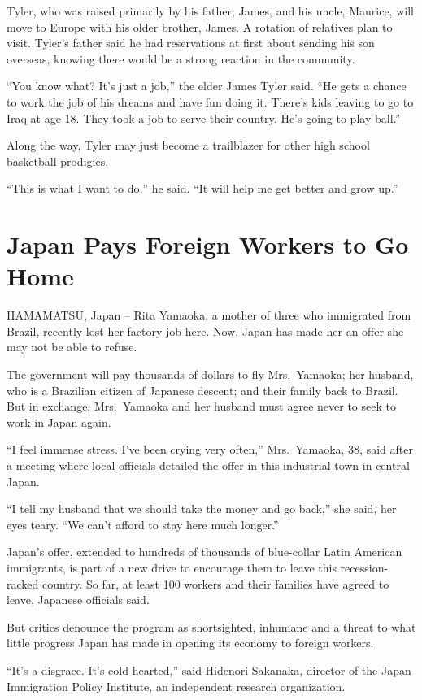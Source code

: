 \documentclass[12pt,a4paper,onecolumn]{article}
\begin{document}
Tyler, who was raised primarily by his father, James, and his uncle, Maurice, will move to Europe
with his older brother, James. A rotation of relatives plan to visit. Tyler's father said he had
reservations at first about sending his son overseas, knowing there would be a strong reaction in
the community.

``You know what? It's just a job,'' the elder James Tyler said. ``He gets a chance to work the job
of his dreams and have fun doing it. There's kids leaving to go to Iraq at age 18. They took a job
to serve their country. He's going to play ball.''

Along the way, Tyler may just become a trailblazer for other high school basketball prodigies.

``This is what I want to do,'' he said. ``It will help me get better and grow up.''

\section{Japan Pays Foreign Workers to Go Home}

HAMAMATSU, Japan -- Rita Yamaoka, a mother of three who immigrated from Brazil, recently lost her
factory job here. Now, Japan has made her an offer she may not be able to refuse.

The government will pay thousands of dollars to fly Mrs.~Yamaoka; her husband, who is a Brazilian
citizen of Japanese descent; and their family back to Brazil. But in exchange, Mrs.~Yamaoka and her
husband must agree never to seek to work in Japan again.

``I feel immense stress. I've been crying very often,'' Mrs.~Yamaoka, 38, said after a meeting where
local officials detailed the offer in this industrial town in central Japan.

``I tell my husband that we should take the money and go back,'' she said, her eyes teary. ``We
can't afford to stay here much longer.''

Japan's offer, extended to hundreds of thousands of blue-collar Latin American immigrants, is part
of a new drive to encourage them to leave this recession-racked country. So far, at least 100
workers and their families have agreed to leave, Japanese officials said.

But critics denounce the program as shortsighted, inhumane and a threat to what little progress
Japan has made in opening its economy to foreign workers.

``It's a disgrace. It's cold-hearted,'' said Hidenori Sakanaka, director of the Japan Immigration
Policy Institute, an independent research organization.
\end{document}
